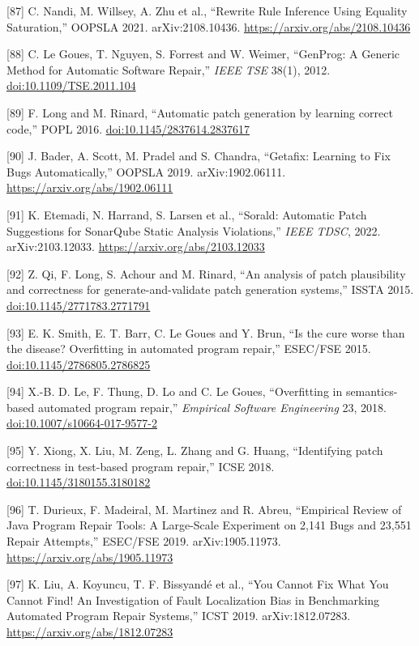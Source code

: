 \documentclass[10pt,letterpaper]{article}
\begin{document}
{[}87{]} C. Nandi, M. Willsey, A. Zhu et al., ``Rewrite Rule Inference
Using Equality Saturation,'' OOPSLA 2021. arXiv:2108.10436.
\url{https://arxiv.org/abs/2108.10436}

{[}88{]} C. Le Goues, T. Nguyen, S. Forrest and W. Weimer, ``GenProg: A
Generic Method for Automatic Software Repair,'' \emph{IEEE TSE} 38(1),
2012.
\href{https://doi.org/10.1109/TSE.2011.104}{doi:10.1109/TSE.2011.104}

{[}89{]} F. Long and M. Rinard, ``Automatic patch generation by learning
correct code,'' POPL 2016.
\href{https://doi.org/10.1145/2837614.2837617}{doi:10.1145/2837614.2837617}

{[}90{]} J. Bader, A. Scott, M. Pradel and S. Chandra, ``Getafix:
Learning to Fix Bugs Automatically,'' OOPSLA 2019. arXiv:1902.06111.
\url{https://arxiv.org/abs/1902.06111}

{[}91{]} K. Etemadi, N. Harrand, S. Larsen et al., ``Sorald: Automatic
Patch Suggestions for SonarQube Static Analysis Violations,'' \emph{IEEE
TDSC}, 2022. arXiv:2103.12033. \url{https://arxiv.org/abs/2103.12033}

{[}92{]} Z. Qi, F. Long, S. Achour and M. Rinard, ``An analysis of patch
plausibility and correctness for generate-and-validate patch generation
systems,'' ISSTA 2015.
\href{https://doi.org/10.1145/2771783.2771791}{doi:10.1145/2771783.2771791}

{[}93{]} E. K. Smith, E. T. Barr, C. Le Goues and Y. Brun, ``Is the cure
worse than the disease? Overfitting in automated program repair,''
ESEC/FSE 2015.
\href{https://doi.org/10.1145/2786805.2786825}{doi:10.1145/2786805.2786825}

{[}94{]} X.-B. D. Le, F. Thung, D. Lo and C. Le Goues, ``Overfitting in
semantics-based automated program repair,'' \emph{Empirical Software
Engineering} 23, 2018.
\href{https://doi.org/10.1007/s10664-017-9577-2}{doi:10.1007/s10664-017-9577-2}

{[}95{]} Y. Xiong, X. Liu, M. Zeng, L. Zhang and G. Huang, ``Identifying
patch correctness in test-based program repair,'' ICSE 2018.
\href{https://doi.org/10.1145/3180155.3180182}{doi:10.1145/3180155.3180182}

{[}96{]} T. Durieux, F. Madeiral, M. Martinez and R. Abreu, ``Empirical
Review of Java Program Repair Tools: A Large-Scale Experiment on 2,141
Bugs and 23,551 Repair Attempts,'' ESEC/FSE 2019. arXiv:1905.11973.
\url{https://arxiv.org/abs/1905.11973}

{[}97{]} K. Liu, A. Koyuncu, T. F. Bissyandé et al., ``You Cannot Fix
What You Cannot Find! An Investigation of Fault Localization Bias in
Benchmarking Automated Program Repair Systems,'' ICST 2019.
arXiv:1812.07283. \url{https://arxiv.org/abs/1812.07283}
\end{document}
